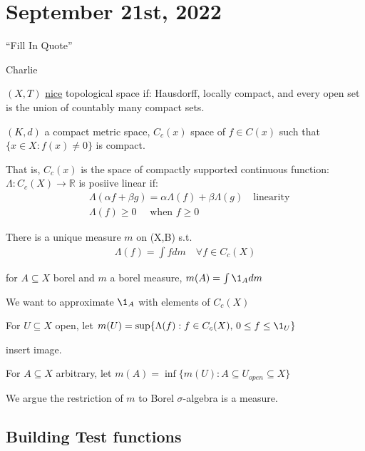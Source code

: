\section{September 21st, 2022}

\epigraph{``Fill In Quote''}{Charlie}

\begin{definition}
	$(X,T)$ \underline{nice} topological space if: Hausdorff, locally compact, and every open set is the union of countably many compact sets.
\end{definition}

\begin{example}
	$(K,d)$ a compact metric space, $C_c (x)$ space of $f \in C(x)$ such that $\{x\in X: f(x) \neq 0 \}$ is compact.

	That is, $C_c (x)$ is the space of compactly supported continuous function:
		$\Lambda : C_c(X) \to \mathbb{R}$ is posiive linear if:
	\begin{align*}
		&\Lambda(\alpha f + \beta g) = \alpha \Lambda(f) + \beta \Lambda(g) \quad \text{linearity} \\
		&\Lambda(f) \geq 0 \quad \text{ when } f \geq 0
	\end{align*} 
\end{example}


\begin{theorem}
	There is a unique measure $m$ on (X,B) s.t.
	\begin{align*}
		\Lambda(f) = \int f dm \quad \forall f \in C_c (X)
	\end{align*} 
\end{theorem}

\begin{definition}[defining m]
	for $A \subseteq X$ borel and $m$ a borel measure, $m(A) = \int \1_{A} dm$
\end{definition}

We want to approximate $\1_A$ with elements of $C_c (X)$

For $U \subseteq X $ open, let $m(U) = \sup\{\Lambda (f) : f \in C_c (X), \, 0 \leq f \leq \1_{U} \}$

insert image.

For $A \subseteq X$ arbitrary, let $m(A) = \inf\{m(U) : A \subseteq U_{open} \subseteq X\}$

We argue the restriction of $m$ to Borel $\sigma$-algebra is a measure.

\subsection{Building Test functions}

